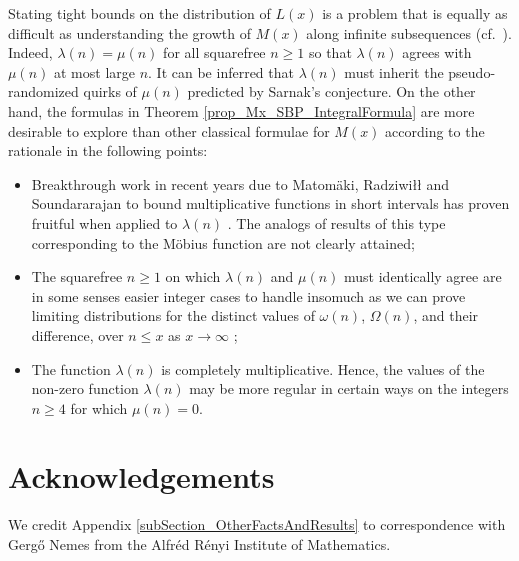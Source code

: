 \documentclass[11pt,reqno,a4letter]{article}
\newcommand{\hlocalref}[1]{\hyperref[#1]{\ref{#1}}}
\numberwithin{equation}{section}
\numberwithin{figure}{section}
\numberwithin{table}{section}
\let\citep\cite
\newcommand{\cf}{cf.~}
\theoremstyle{plain}
\numberwithin{theorem}{section}
\theoremstyle{definition}
\theoremstyle{remark}
\begin{document}
Stating tight bounds on the distribution of 
$L(x)$ is a problem that is equally as difficult 
as understanding the growth of $M(x)$
along infinite subsequences (\cf \cite{MR2877066,MR3779960,TAO-LOGAVGD-CHOWLA}). 
Indeed, $\lambda(n) = \mu(n)$ for all squarefree $n \geq 1$ so that 
$\lambda(n)$ agrees with $\mu(n)$ at most large $n$. 
It can be inferred that $\lambda(n)$ must inherit the pseudo-randomized quirks 
of $\mu(n)$ predicted by Sarnak's conjecture. 
On the other hand, the formulas in 
Theorem \hlocalref{prop_Mx_SBP_IntegralFormula} are more desirable to explore than 
other classical formulae for $M(x)$ according to the rationale in the following points:
\begin{itemize}
\item Breakthrough work in recent years due to 
	 Matom\"aki, Radziwi{\l\l} and Soundararajan to 
	 bound multiplicative functions 
	 in short intervals has 
	 proven fruitful when applied to $\lambda(n)$ 
	 \cite{SOUND-LLAMBDA-SHORT-INTS,MATRADZE-MULTFUNCS-SHORT-INTS}. 
	 The analogs of results of this type corresponding 
	 to the M\"obius function are not clearly attained; 
\item The squarefree $n \geq 1$ on which $\lambda(n)$ and $\mu(n)$ must identically agree 
	 are in some senses easier integer cases to handle 
	 insomuch as we can prove limiting distributions for the distinct values of 
	 $\omega(n)$, $\Omega(n)$, and their difference, over $n \leq x$ as $x \rightarrow \infty$ 
	 \citep[\cf \S 2.4; \S 7.4]{MV}; 
\item The function $\lambda(n)$ is completely 
	 multiplicative. Hence, the values of the non-zero function $\lambda(n)$ may be 
	 more regular in certain ways on the integers $n \geq 4$ for which $\mu(n) = 0$. 
\end{itemize}

\section*{Acknowledgements}

We credit Appendix \hlocalref{subSection_OtherFactsAndResults} 
to correspondence with 
Gerg\H{o} Nemes from the Alfr\'{e}d R\'{e}nyi Institute of Mathematics. 

\renewcommand{\refname}{References} 

\end{document}
